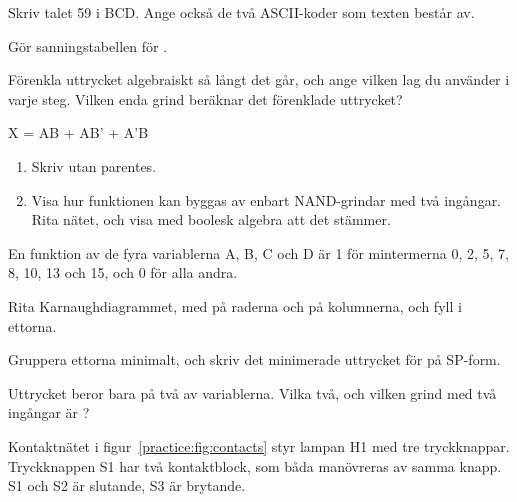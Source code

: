  Skriv talet 59 i BCD. Ange också de två ASCII-koder som texten  består av.

\label{practice:q:2}

 Gör sanningstabellen för . 

 Förenkla uttrycket algebraiskt så långt det går, och ange vilken lag du använder i varje
steg. Vilken enda grind beräknar det förenklade uttrycket? 

\begin{console}
X = AB + AB' + A'B
\end{console}

\leavevmode
\begin{enumerate}
  \item Skriv  utan parentes. 
  \item Visa hur funktionen  kan byggas av enbart NAND-grindar med två ingångar. Rita
    nätet, och visa med boolesk algebra att det stämmer. 
\end{enumerate}

\label{practice:q:3}

En funktion  av de fyra variablerna A, B, C och D är 1 för mintermerna 0, 2, 5, 7, 8, 10,
13 och 15, och 0 för alla andra.

 Rita Karnaughdiagrammet, med  på raderna och  på kolumnerna, och fyll i
ettorna. 

 Gruppera ettorna minimalt, och skriv det minimerade uttrycket för  på SP-form.

 Uttrycket beror bara på två av variablerna. Vilka två, och vilken grind med två ingångar
är ? 

\label{practice:q:4}

Kontaktnätet i figur~\ref{practice:fig:contacts} styr lampan H1 med tre tryckknappar. Tryckknappen
S1 har två kontaktblock, som båda manövreras av samma knapp. S1 och S2 är slutande, S3 är brytande.


